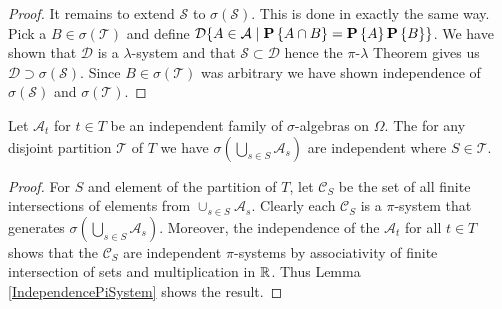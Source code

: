 \begin{proof}
It remains to extend $\mathcal{S}$ to $\sigma(\mathcal{S})$.  This is
done in exactly the same way.   Pick a $B \in \sigma(\mathcal{T})$ and define $\mathcal{D} \lbrace A \in
  \mathcal{A} \mid  \textbf{P}\left \{A \cap B \right \} =  \textbf{P}\left \{A \right \}
  \textbf{P}\left \{B \right \} \rbrace$.  We have shown that  $\mathcal{D}$ is a
  $\lambda$-system and that $\mathcal{S} \subset \mathcal{D}$ hence
  the $\pi$-$\lambda$ Theorem gives us $\mathcal{D} \supset
  \sigma(\mathcal{S})$.  Since $B\in \sigma(\mathcal{T})$ was
  arbitrary we have shown independence of $\sigma(\mathcal{S})$ and $\sigma(\mathcal{T})$.
\end{proof}

\begin{lem}\label{IndependenceGrouping}Let $\mathcal{A}_t$ for $t \in
  T$ be an independent family of $\sigma$-algebras on $\Omega$.  The
  for any disjoint partition $\mathcal{T}$ of $T$ we have
  $\sigma(\bigcup_{s \in S} \mathcal{A}_s)$ are independent where $S
  \in \mathcal{T}$.
\end{lem}
\begin{proof}
For $S$ and element of the partition of $T$, let $\mathcal{C}_S$ be
the set of all finite intersections of elements from $\cup_{s \in S}
\mathcal{A}_s$.  Clearly each $\mathcal{C}_S$ is a $\pi$-system that
generates $\sigma (\bigcup_{s \in S} \mathcal{A}_s)$.  Moreover,
the independence of the $\mathcal{A}_t$ for all $t \in T$ shows that
the $\mathcal{C}_S$ are independent $\pi$-systems by
associativity of finite intersection of sets and multiplication in $\mathbb{R}$.
Thus Lemma \ref{IndependencePiSystem} shows the result.
\end{proof}

